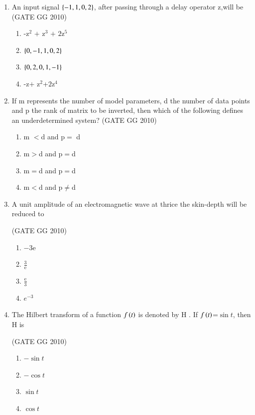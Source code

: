 \documentclass[journal]{IEEEtran}
\begin{document}
\begin{enumerate}[start=26]
\item An input signal $\left\{-1,1,0,2\right\}$, after passing through a delay 
operator z,will be\\

\hfill (GATE GG 2010) 

\begin{enumerate}

    \item -z$^2$ $+$ z$^3$ $+$ $2$z$^5$
    \item $\left\{0,-1,1,0,2\right\}$
    \item $\left\{0,2,0,1,-1\right\}$
    \item -z$+$ z$^2$+$2$z$^4$
\end{enumerate}
\item If m represents the number of model parameters, d the number of data points and p the rank of matrix to be inverted, then which of the following defines an underdetermined system?
\hfill (GATE GG 2010) 
\begin{enumerate}
    \item  m $<$d and p$=$ d
\item  m$>$d and p$=$d
\item  m$=$d and p$=$d
\item  m$<$d and p$\neq$d
\end{enumerate}

\item A unit amplitude of an electromagnetic wave at thrice the skin-depth will be reduced to

\hfill (GATE GG 2010) 
\begin{multicols}{4}

\begin{enumerate}
    \item $-3$e
\item $\frac{3}{\text{e}}$
\item $\frac{\text{e}}{3}$
\item $e^{-3}$
\end{enumerate}
\end{multicols}

\item The Hilbert transform of a function $f\left(t\right)$ is denoted by H . If $f\left(t\right)$=$\sin{t}$, then H  is

\hfill (GATE GG 2010) 
\begin{multicols}{4}

\begin{enumerate}
    \item $-\sin{t}$
\item $-\cos{t}$
\item $\sin{t}$
\item $\cos{t}$
\end{enumerate}
\end{multicols}


\end{enumerate}
\end{document}
